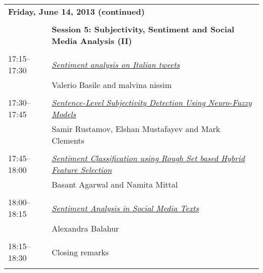 \newpage
\begin{tabular}{p{20mm}p{138mm}}
\\
\multicolumn{2}{l}{\bf Friday, June 14, 2013
 (continued)} \\\\
 & {\bf Session 5: Subjectivity, Sentiment and Social Media Analysis (II)
} \\
\\
17:15--17:30 & \hyperlink{page.100}{\em Sentiment analysis on Italian tweets}\\
         & Valerio Basile and malvina nissim \\
\\

17:30--17:45 & \hyperlink{page.108}{\em Sentence-Level Subjectivity Detection Using Neuro-Fuzzy Models}\\
         & Samir Rustamov, Elshan Mustafayev and Mark Clements \\
\\

17:45--18:00 & \hyperlink{page.115}{\em Sentiment Classification using Rough Set based Hybrid Feature Selection}\\
         & Basant Agarwal and Namita Mittal \\
\\

18:00--18:15 & \hyperlink{page.120}{\em Sentiment Analysis in Social Media Texts}\\
         & Alexandra Balahur \\
\\

18:15--18:30 & Closing remarks \\
\\


\end{tabular}
